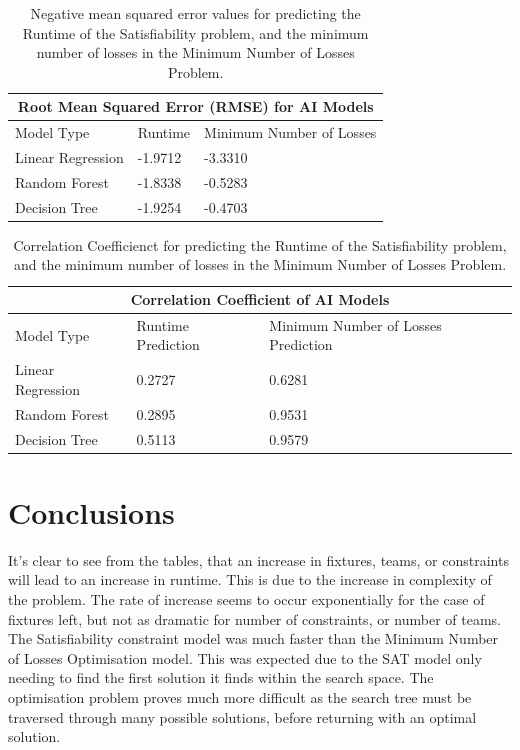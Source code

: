 \documentclass{article}
\begin{document}
	\begin{table}[h!]
		\centering
		\begin{tabular}{ |p{3cm}||p{1.5cm}| |p{1.5cm}| }
			\hline\multicolumn{3}{|c|}{Root Mean Squared Error (RMSE) for AI Models} \\
			\hline
			\hline
			Model Type & Runtime & Minimum Number of Losses\\
			\hline
			Linear Regression   & -1.9712    & -3.3310\\
			Random Forest &   -1.8338  & -0.5283\\
			Decision Tree & -1.9254 & -0.4703\\
			\hline
		\end{tabular}
		\caption{Negative mean squared error values for predicting the Runtime of the Satisfiability problem, and the minimum number of losses in the Minimum Number of Losses Problem.}
	\end{table}

	\begin{table}
		\centering
		\begin{tabular}{ |p{3cm}||p{3cm}| |p{3cm}| }
			\hline\multicolumn{3}{|c|}{Correlation Coefficient of AI Models} \\
			\hline
			\hline
			Model Type & Runtime Prediction & Minimum Number of Losses Prediction\\
			\hline
			Linear Regression   & 0.2727    & 0.6281\\
			Random Forest &   0.2895  & 0.9531\\
			Decision Tree & 0.5113 & 0.9579\\
			\hline
		\end{tabular}
		\caption{Correlation Coefficienct for predicting the Runtime of the Satisfiability problem, and the minimum number of losses in the Minimum Number of Losses Problem.}
	\end{table}




	
	\newpage
	\section{Conclusions}
	It’s clear to see from the tables, that an increase in fixtures, teams, or constraints will lead to an increase in runtime. This is due to the increase in complexity of the problem. The rate of increase seems to occur exponentially for the case of fixtures left, but not as dramatic for number of constraints, or number of teams. The Satisfiability constraint model was much faster than the Minimum Number of Losses Optimisation model. This was expected due to the SAT model only needing to find the first solution it finds within the search space. The optimisation problem proves much more difficult as the search tree must be traversed through many possible solutions, before returning with an optimal solution. 
	
\end{document}
